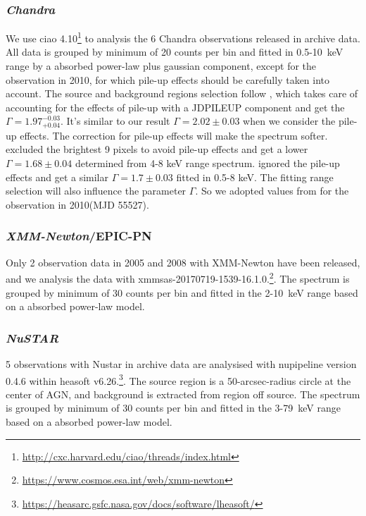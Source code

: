 \documentclass{aastex63}
\newcommand{\xmm}{{\em XMM-Newton}}
\newcommand{\nustar}{{\em NuSTAR}}
\newcommand{\chandra}{{\em Chandra}}
\begin{document}
\subsubsection{\chandra}
We use ciao 4.10\footnote{\url{http://cxc.harvard.edu/ciao/threads/index.html}} to analysis the 6 Chandra observations released in archive data. All data is grouped by minimum of 20 counts per bin and fitted in 0.5-10~keV range by a absorbed power-law plus gaussian component, except for the observation in 2010, for which pile-up effects should be carefully taken into account. The source and background regions selection follow \citet{2017ApJ...840...11L}, which takes care of accounting for the effects of pile-up with a JDPILEUP component and get the  $\Gamma =1.97_{+0.04}^{-0.03}$. It's similar to our result $\Gamma =2.02\pm{0.03}$ when we consider the pile-up effects. The correction for pile-up effects will make the spectrum softer. \citet{2016A&A...593L...9H} excluded the brightest 9 pixels to avoid pile-up effects and get a lower $\Gamma =1.68\pm0.04$ determined from 4-8 keV range spectrum. \citet{2017A&A...607L...9K} ignored the pile-up effects and get a similar $\Gamma =1.7\pm0.03$ fitted in 0.5-8 keV. The fitting range selection will also influence the parameter $\Gamma$. So we adopted values from \citet{2017A&A...607L...9K} for the observation in 2010(MJD 55527).

\subsubsection{\xmm/EPIC-PN}
Only 2 observation data in 2005 and 2008 with XMM-Newton have been released, and we analysis the data with xmmsas-20170719-1539-16.1.0.\footnote{\url{https://www.cosmos.esa.int/web/xmm-newton}}. The spectrum is grouped by minimum of 30 counts per bin and fitted in the 2-10~keV range based on a absorbed power-law model. 

\subsubsection{\nustar}
5 observations with Nustar in archive data are analysised with nupipeline version 0.4.6 within heasoft v6.26.\footnote{\url{https://heasarc.gsfc.nasa.gov/docs/software/lheasoft/}}. The source region is a 50-arcsec-radius circle at the center of AGN, and background is extracted from region off source. The spectrum is grouped by minimum of 30 counts per bin and fitted in the 3-79~keV range based on a absorbed power-law model.
\end{document}
